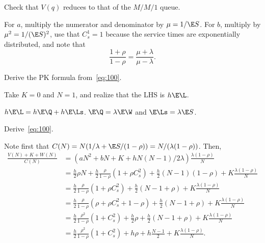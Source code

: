 \begin{exercise}
 Check  that $V(q)$ reduces to that of the $M/M/1$ queue.
\begin{solution}
  For $a$, multiply the numerator and denominator by $\mu=1/ \E S$.
  For $b$, multiply by $\mu^2 = 1/(\E S)^2$, use that $C_s^1=1$ because the service times are exponentially distributed, and note that
  \begin{equation*}
    \frac{1+\rho}{1-\rho} = \frac{\mu + \lambda}{\mu-\lambda}.
  \end{equation*}
\end{solution}
\end{exercise}


\begin{exercise}\label{ex:69}
Derive the PK formula from~\cref{eq:100}.
\begin{hint}
Take  $K=0$ and $N=1$, and realize that the LHS is $h\E \L$.
\end{hint}
\begin{solution}
$h\E \L = h \E\Q + h \E\Ls$. $\E \Q = \lambda \E\W$ and $\E \Ls = \lambda \E S$.
\end{solution}
\end{exercise}


\begin{exercise}\label{ex:n-mg3}
Derive~\cref{eq:100}.
\begin{solution}
  Note first that $C(N) = N(1/\lambda + \E S / (1-\rho)) = N/(\lambda(1-\rho))$. Then,
  \begin{align*}
    \frac{V(N) + K + W(N)}{C(N)}
    &= \left(aN^2 + bN + K + h N(N-1)/2 \lambda\right) \frac{\lambda(1-\rho)}N \\
    &= \frac h 2 \rho N  + \frac h 2 \frac \rho{1-\rho} (1+\rho C_s^2) + \frac h 2 (N-1)(1-\rho) + K \frac{\lambda(1-\rho)}N \\
    &= \frac h 2 \frac \rho{1-\rho} (1+\rho C_s^2) + \frac h 2 (N-1 + \rho) + K \frac{\lambda(1-\rho)}N \\
    &= \frac h 2 \frac \rho{1-\rho} (\rho + \rho C_s^2 + 1 - \rho) + \frac h 2 (N-1 + \rho) + K \frac{\lambda(1-\rho)}N \\
    &= \frac h 2 \frac{\rho^2}{1-\rho} (1+ C_s^2) +\frac h 2 \rho + \frac h 2 (N-1 + \rho) + K \frac{\lambda(1-\rho)}N \\
    &= \frac h 2 \frac{\rho^2}{1-\rho} (1+ C_s^2) + h \rho + h \frac{N-1}2 + K \frac{\lambda(1-\rho)}N.
  \end{align*}
\end{solution}
\end{exercise}

